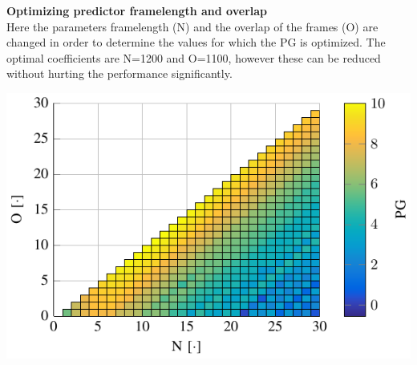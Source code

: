
 \begin{minipage}{.4\columnwidth}
	 	\textbf{Optimizing predictor framelength and overlap}\\
		Here the parameters framelength (N) and the overlap of the frames (O) are changed in order to determine the values for which the PG is optimized. The optimal coefficients are N=1200 and O=1100, however these can be reduced without hurting the performance significantly.
	\label{fig:HammingNOP10}
\end{minipage}%
\begin{minipage}{0.5\columnwidth}
	\includegraphics[width=\textwidth]{figures/HammingNOP10.pdf}
\end{minipage}

